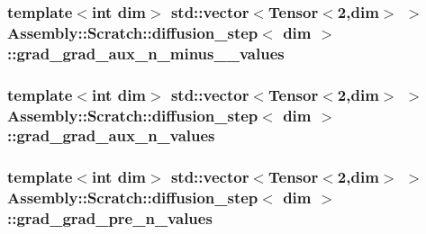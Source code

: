 \subsubsection[{grad\+\_\+grad\+\_\+aux\+\_\+n\+\_\+minus\+\_\+1\+\_\+values}]{\setlength{\rightskip}{0pt plus 5cm}template$<$int dim$>$ std\+::vector$<$Tensor$<$2,dim$>$ $>$ {\bf Assembly\+::\+Scratch\+::diffusion\+\_\+step}$<$ dim $>$\+::grad\+\_\+grad\+\_\+aux\+\_\+n\+\_\+minus\+\_\+\_\+values}\label{struct_assembly_1_1_scratch_1_1diffusion__step_a0bbde8769e9f2cc428d9bf0f810c7227}
\hypertarget{struct_assembly_1_1_scratch_1_1diffusion__step_a8bc0709a8e9e4ba5e0f663e134444978}{}
\subsubsection[{grad\+\_\+grad\+\_\+aux\+\_\+n\+\_\+values}]{\setlength{\rightskip}{0pt plus 5cm}template$<$int dim$>$ std\+::vector$<$Tensor$<$2,dim$>$ $>$ {\bf Assembly\+::\+Scratch\+::diffusion\+\_\+step}$<$ dim $>$\+::grad\+\_\+grad\+\_\+aux\+\_\+n\+\_\+values}\label{struct_assembly_1_1_scratch_1_1diffusion__step_a8bc0709a8e9e4ba5e0f663e134444978}
\hypertarget{struct_assembly_1_1_scratch_1_1diffusion__step_a64c3cf16bc7cf4fa8972153f93014cb9}{}
\subsubsection[{grad\+\_\+grad\+\_\+pre\+\_\+n\+\_\+values}]{\setlength{\rightskip}{0pt plus 5cm}template$<$int dim$>$ std\+::vector$<$Tensor$<$2,dim$>$ $>$ {\bf Assembly\+::\+Scratch\+::diffusion\+\_\+step}$<$ dim $>$\+::grad\+\_\+grad\+\_\+pre\+\_\+n\+\_\+values}\label{struct_assembly_1_1_scratch_1_1diffusion__step_a64c3cf16bc7cf4fa8972153f93014cb9}
\hypertarget{struct_assembly_1_1_scratch_1_1diffusion__step_aa11a441604ebd698e5294c6ab3a1ffaf}{}
